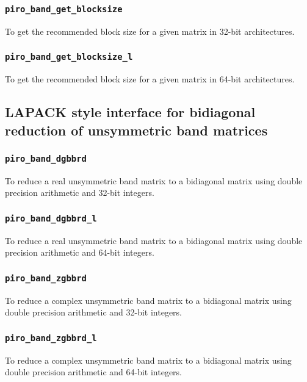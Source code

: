 \documentclass[11pt]{article}
\begin{document}
\subsubsection{{\tt piro\_band\_get\_blocksize}}

To get the recommended block size for a given matrix in 32-bit architectures.

\subsubsection{{\tt piro\_band\_get\_blocksize\_l}}

To get the recommended block size for a given matrix in 64-bit architectures.

\subsection{LAPACK style interface for bidiagonal reduction of unsymmetric band matrices}

\subsubsection{{\tt piro\_band\_dgbbrd}}

To reduce a real unsymmetric band matrix to a bidiagonal matrix using double 
precision arithmetic and 32-bit integers.

\subsubsection{{\tt piro\_band\_dgbbrd\_l}}

To reduce a real unsymmetric band matrix to a bidiagonal matrix using double 
precision arithmetic and 64-bit integers.

\subsubsection{{\tt piro\_band\_zgbbrd}}

To reduce a complex unsymmetric band matrix to a bidiagonal matrix using double 
precision arithmetic and 32-bit integers.

\subsubsection{{\tt piro\_band\_zgbbrd\_l}}

To reduce a complex unsymmetric band matrix to a bidiagonal matrix using double 
precision arithmetic and 64-bit integers.
\end{document}
